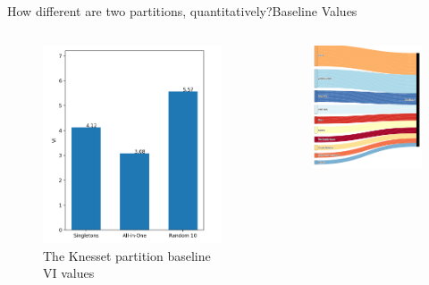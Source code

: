 \documentclass[xcolor=dvipsnames]{beamer}
\begin{document}
\begin{frame}{How different are two partitions, quantitatively?}{Baseline Values}
  \begin{columns}
  \begin{figure}
    \includegraphics[width=\linewidth]{vi_baselines}
    \caption{The Knesset partition baseline VI values}
  \end{figure}
  \begin{figure}
    \includegraphics[width=\linewidth]{friends}

\end{figure}
\end{columns}
\end{frame}
\end{document}
